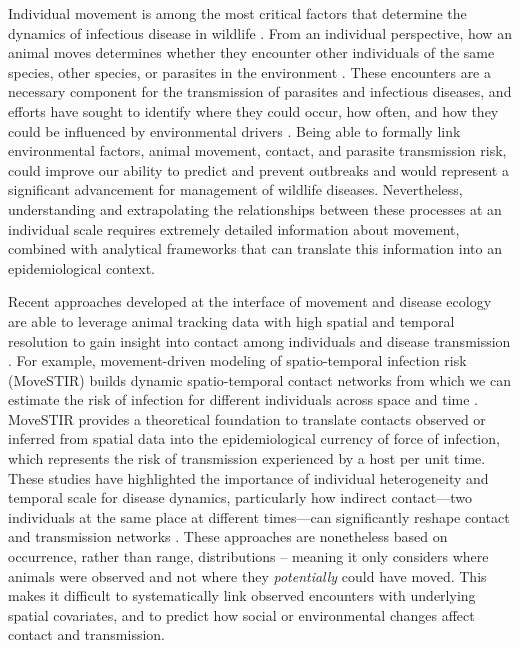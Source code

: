 \documentclass[letterpaper]{article}
\begin{document}
Individual movement is among the most critical factors that determine the dynamics of infectious disease in wildlife \citep{Dougherty2018,Manlove2022}. 
From an individual perspective, how an animal moves determines whether they encounter other individuals of the same species, other species, or parasites in the environment \citep{Martinez-Garcia2020,Das2023}. 
These encounters are a necessary component for the transmission of parasites and infectious diseases, and efforts have sought to identify where they could occur, how often, and how they could be influenced by environmental drivers \citep{Titcomb2021,Dougherty2022}. 
Being able to formally link environmental factors, animal movement, contact, and parasite transmission risk, could improve our ability to predict and prevent outbreaks and would represent a significant advancement for management of wildlife diseases.  
Nevertheless, understanding and extrapolating the relationships between these processes at an individual scale requires extremely detailed information about movement, combined with analytical frameworks that can translate this information into an epidemiological context.

Recent approaches developed at the interface of movement and disease ecology are able to leverage animal tracking data with high spatial and temporal resolution to gain insight into contact among individuals and disease transmission \citep{Richardson2015,Wilber2022,Yang2023}. For example, movement-driven modeling of spatio-temporal infection risk (MoveSTIR) builds dynamic spatio-temporal contact networks from which we can estimate the risk of infection for different individuals across space and time \citep{Wilber2022}. MoveSTIR provides a theoretical foundation to translate contacts observed or inferred from spatial data into the epidemiological currency of force of infection, which represents the risk of transmission experienced by a host per unit time. These studies have highlighted the importance of individual heterogeneity and temporal scale for disease dynamics, particularly how indirect contact---two individuals at the same place at different times---can significantly reshape contact and transmission networks \citep{Richardson2015,Yang2023}. These approaches are nonetheless based on occurrence, rather than range, distributions \citep[in the terminology of ][]{Alston2022} -- meaning it only considers where animals were observed and not where they \emph{potentially} could have moved. This makes it difficult to systematically link observed encounters with underlying spatial covariates, and to predict how social or environmental changes affect contact and transmission. 
\end{document}
